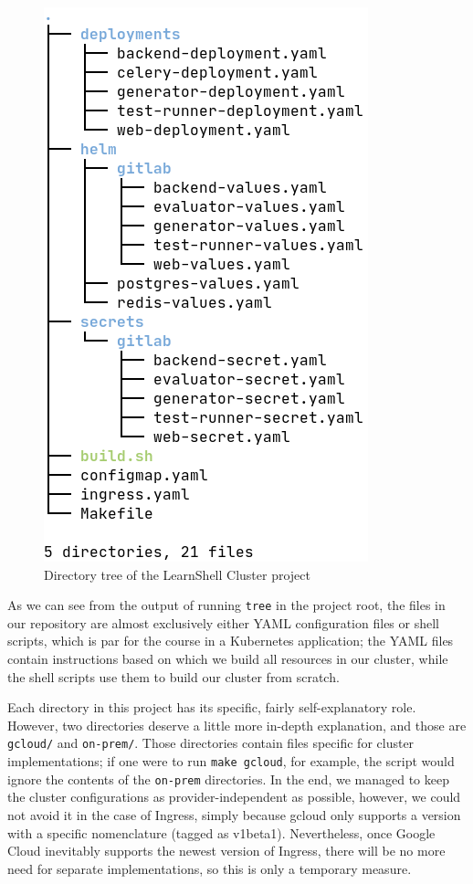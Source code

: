 \documentclass[thesis=B,english]{FITthesis}[2019/12/23]
\begin{document}
\begin{figure}[H]
\caption{Directory tree of the LearnShell Cluster project}
\includegraphics[scale=0.5]{tree}
\end{figure}


As we can see from the output of running \verb|tree| in the project root, the files in our repository are almost exclusively either YAML configuration files or shell scripts, which is par for the course in a Kubernetes application; the YAML files contain instructions based on which we build all resources in our cluster, while the shell scripts use them to build our cluster from scratch.

Each directory in this project has its specific, fairly self-explanatory role. However, two directories deserve a little more in-depth explanation, and those are \verb|gcloud/| and \verb|on-prem/|. Those directories contain files specific for cluster implementations; if one were to run \verb|make gcloud|, for example, the script would ignore the contents of the \verb|on-prem| directories. In the end, we managed to keep the cluster configurations as provider-independent as possible, however, we could not avoid it in the case of Ingress, simply because gcloud only supports a version with a specific nomenclature (tagged as v1beta1). Nevertheless, once Google Cloud inevitably supports the newest version of Ingress, there will be no more need for separate implementations, so this is only a temporary measure.
\end{document}
